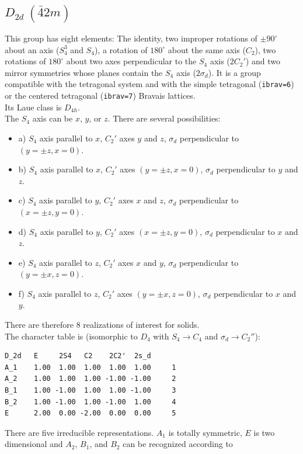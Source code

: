 \documentclass[12pt,a4paper]{article}
\begin{document}
\subsection{\color{web-blue}$D_{2d}\ (\bar 42m)$} 
This group has eight elements: The identity, two improper rotations 
of $\pm90^\circ$ about an axis ($S_4^3$ and $S_4$), a rotation of 
$180^\circ$ about the same axis ($C_2$), two rotations of $180^\circ$ about
two axes perpendicular to the $S_4$ axis ($2C_2'$) and two mirror symmetries
whose planes contain the $S_4$ axis ($2\sigma_d$).
It is a group compatible with the tetragonal system and with the simple 
tetragonal (\texttt{ibrav=6}) or the centered tetragonal (\texttt{ibrav=7}) 
Bravais lattices. \\
Its Laue class is $D_{4h}$. \\
The $S_4$ axis can be $x$, $y$, or $z$. There are several possibilities:
\begin{itemize}
\item a) $S_4$ axis parallel to $x$, $C_2'$ axes $y$ and $z$, $\sigma_d$
perpendicular to $(y=\pm z, x=0)$.
\item b) $S_4$ axis parallel to $x$, $C_2'$ axes $(y=\pm z, x=0)$, $\sigma_d$
perpendicular to $y$ and $z$.
\item c) $S_4$ axis parallel to $y$, $C_2'$ axes $x$ and $z$, $\sigma_d$
perpendicular to $(x=\pm z, y=0)$.
\item d) $S_4$ axis parallel to $y$, $C_2'$ axes $(x=\pm z, y=0)$, $\sigma_d$
perpendicular to $x$ and $z$.
\item e) $S_4$ axis parallel to $z$, $C_2'$ axes $x$ and $y$, $\sigma_d$
perpendicular to $(y=\pm x, z=0)$.
\item f) $S_4$ axis parallel to $z$, $C_2'$ axes $(y=\pm x, z=0)$, $\sigma_d$
perpendicular to $x$ and $y$.
\end{itemize}
There are therefore $8$ realizations of interest for solids.\\
The character table is (isomorphic to $D_4$ with $S_4 \rightarrow C_4$
and $\sigma_d \rightarrow C_2''$):
\begin{verbatim}
D_2d   E     2S4   C2    2C2'  2s_d
A_1    1.00  1.00  1.00  1.00  1.00     1
A_2    1.00  1.00  1.00 -1.00 -1.00     2
B_1    1.00 -1.00  1.00  1.00 -1.00     3
B_2    1.00 -1.00  1.00 -1.00  1.00     4
E      2.00  0.00 -2.00  0.00  0.00     5
\end{verbatim}
There are five irreducible representations. $A_1$ is totally symmetric, $E$
is two dimensional and $A_2$, $B_1$, and $B_2$ can be recognized according to
\end{document}
